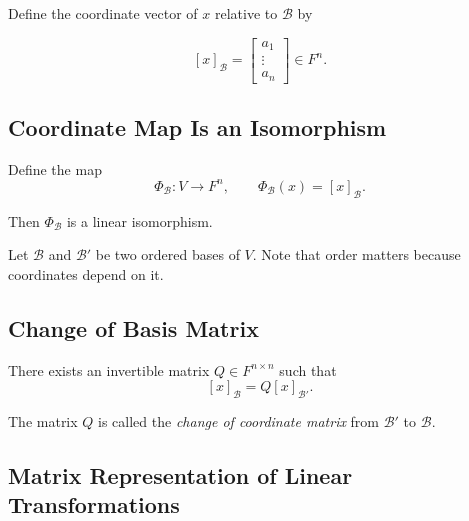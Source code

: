 \documentclass[12pt]{article}
\theoremstyle{remark}
\theoremstyle{definition}
\begin{document}
Define the coordinate vector of $x$ relative to $\mathcal{B}$ by

\[
[x]_{\mathcal{B}} =
\begin{bmatrix}
a_1 \\ \vdots \\ a_n
\end{bmatrix}
\in F^n.
\]

\subsection*{Coordinate Map Is an Isomorphism}

Define the map
\[
\Phi_{\mathcal{B}} : V \to F^n,
\qquad
\Phi_{\mathcal{B}}(x) = [x]_{\mathcal{B}}.
\]

Then $\Phi_{\mathcal{B}}$ is a linear isomorphism.

\begin{center}
\end{center}

Let $\mathcal{B}$ and $\mathcal{B}'$ be two ordered bases of $V$. Note that order matters because coordinates depend on it.



\subsection*{Change of Basis Matrix}

There exists an invertible matrix $Q \in F^{n \times n}$ such that
\[
[x]_{\mathcal{B}} = Q [x]_{\mathcal{B}'}.
\]

The matrix $Q$ is called the \emph{change of coordinate matrix}
from $\mathcal{B}'$ to $\mathcal{B}$.

\begin{center}
\end{center}

\subsection*{Matrix Representation of Linear Transformations}
\end{document}
